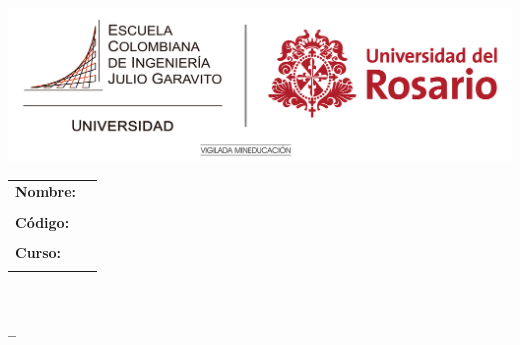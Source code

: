 \pagestyle{head}
\firstpageheadrule
{}
\runningheadrule
\begin{minipage}[t]{0.6\textwidth}
\hspace{-0.1em}
\includegraphics[scale=0.15]{Uni_logo.png}
\end{minipage}%
\begin{minipage}[t]{0.4\textwidth}
	\vspace*{-2.8cm}
	\begin{tabular}{l p{0.5in}}
		\textbf{Nombre:} & \makebox[1.5in]{\hrulefill} \\
		\\
		\textbf{Código:} & \makebox[1.5in]{\hrulefill} \\
		\\
		\textbf{Curso:} & \makebox[1.5in]{\hrulefill} \\
		\\
	\end{tabular}
\end{minipage}



	\begin{center}
	\begin{Large}
		\textbf{\career}
	\\ \bigskip
    \textbf{\class}
    \\ \bigskip
    \textbf{\examnum -- \examdate}	
	\\ \bigskip
	\term
    \\ \bigskip
    \end{Large}
	\end{center}

	     \smallskip
	\bigskip
	
	 \fbox{\parbox[c][1em][l]{0.8in}{\ \examdate}}  	\hfill
	 \fbox{\parbox[c][1em][l]{1.4in}{\ \timelimit}}  	
	\bigskip\smallskip
	
